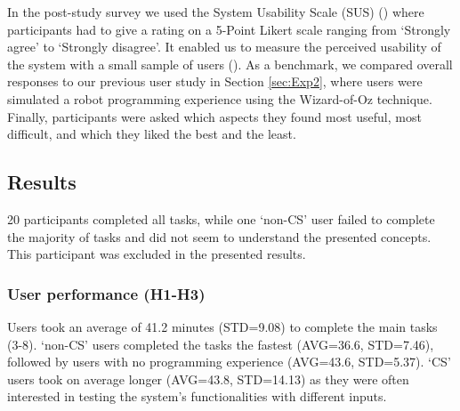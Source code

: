 In the post-study survey we used the System Usability Scale (SUS) (\cite{brooke1996sus}) where participants had to give a rating on a 5-Point Likert scale ranging from `Strongly agree' to `Strongly disagree'.
It enabled us to measure the perceived usability of the system with a small sample of users (\cite{tullis2004comparison}).
As a benchmark, we compared overall responses to our previous user study in Section \ref{sec:Exp2}, where users were simulated a robot programming experience using the Wizard-of-Oz technique.
Finally, participants were asked which aspects they found most useful, most difficult, and which they liked the best and the least.



\subsection{Results}
20 participants completed all tasks, while one `non-CS' user failed to complete the majority of tasks and did not seem to understand the presented concepts.
This participant was excluded in the presented results.

\subsubsection{User performance (H1-H3)} 
Users took an average of 41.2 minutes (STD=9.08) to complete the main tasks (3-8).
`non-CS' users completed the tasks the fastest (AVG=36.6, STD=7.46), followed by users with no programming experience (AVG=43.6, STD=5.37).
`CS' users took on average longer (AVG=43.8, STD=14.13) as they were often interested in testing the system's functionalities with different inputs.

